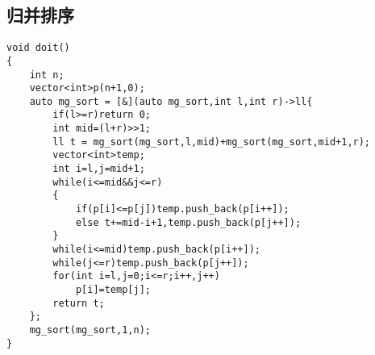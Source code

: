 \documentclass[12pt, a4paper, oneside]{ctexart}
\begin{document}
\subsection{归并排序} 
\begin{lstlisting}
void doit()
{
	int n;
	vector<int>p(n+1,0);
	auto mg_sort = [&](auto mg_sort,int l,int r)->ll{
		if(l>=r)return 0;
		int mid=(l+r)>>1;
		ll t = mg_sort(mg_sort,l,mid)+mg_sort(mg_sort,mid+1,r);
		vector<int>temp;
		int i=l,j=mid+1;
		while(i<=mid&&j<=r)
		{
			if(p[i]<=p[j])temp.push_back(p[i++]);
			else t+=mid-i+1,temp.push_back(p[j++]);
		}
		while(i<=mid)temp.push_back(p[i++]);
		while(j<=r)temp.push_back(p[j++]);
		for(int i=l,j=0;i<=r;i++,j++)
			p[i]=temp[j];
		return t;
	};
	mg_sort(mg_sort,1,n);
}
\end{lstlisting}
\end{document}
